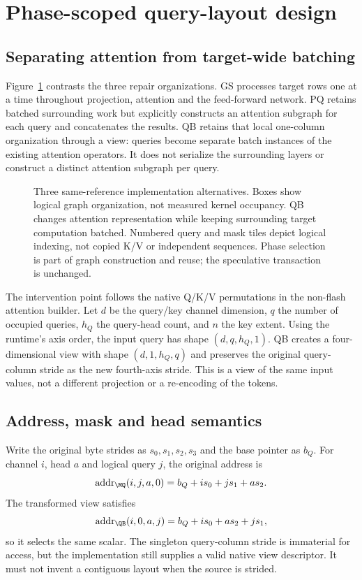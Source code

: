 \section{Phase-scoped query-layout design}
\label{sec:method}
\subsection{Separating attention from target-wide batching}
Figure~\ref{fig:design} contrasts the three repair organizations. GS processes target rows one at a time throughout projection, attention and the feed-forward network. PQ retains batched surrounding work but explicitly constructs an attention subgraph for each query and concatenates the results. QB retains that local one-column organization through a view: queries become separate batch instances of the existing attention operators. It does not serialize the surrounding layers or construct a distinct attention subgraph per query.

\begin{figure}[t]
\centering
\caption{Three same-reference implementation alternatives. Boxes show logical graph organization, not measured kernel occupancy. QB changes attention representation while keeping surrounding target computation batched. Numbered query and mask tiles depict logical indexing, not copied K/V or independent sequences. Phase selection is part of graph construction and reuse; the speculative transaction is unchanged.}
\label{fig:design}
\end{figure}

The intervention point follows the native Q/K/V permutations in the non-flash attention builder. Let $d$ be the query/key channel dimension, $q$ the number of occupied queries, $h_Q$ the query-head count, and $n$ the key extent. Using the runtime's axis order, the input query has shape $(d,q,h_Q, 1)$. QB creates a four-dimensional view with shape $(d, 1,h_Q,q)$ and preserves the original query-column stride as the new fourth-axis stride. This is a view of the same input values, not a different projection or a re-encoding of the tokens.

\subsection{Address, mask and head semantics}
Write the original byte strides as $s_0,s_1,s_2,s_3$ and the base pointer as $b_Q$. For channel $i$, head $a$ and logical query $j$, the original address is
\begin{equation}
\operatorname{addr}_{\MQ}(i,j,a, 0)=b_Q+i s_0+j s_1+a s_2.
\end{equation}
The transformed view satisfies
\begin{equation}
\operatorname{addr}_{\QB}(i, 0,a,j)=b_Q+i s_0+a s_2+j s_1,
\label{eq:address}
\end{equation}
so it selects the same scalar. The singleton query-column stride is immaterial for access, but the implementation still supplies a valid native view descriptor. It must not invent a contiguous layout when the source is strided.

